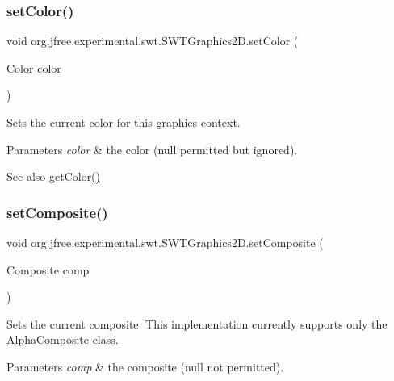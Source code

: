 \subsubsection{\texorpdfstring{set\+Color()}{setColor()}}
{\footnotesize\ttfamily void org.\+jfree.\+experimental.\+swt.\+S\+W\+T\+Graphics2\+D.\+set\+Color (\begin{DoxyParamCaption}\item[{Color}]{color }\end{DoxyParamCaption})}

Sets the current color for this graphics context.


\begin{DoxyParams}{Parameters}
{\em color} & the color ({\ttfamily null} permitted but ignored).\\
\hline
\end{DoxyParams}
\begin{DoxySeeAlso}{See also}
\mbox{\hyperlink{classorg_1_1jfree_1_1experimental_1_1swt_1_1_s_w_t_graphics2_d_ad1120d4f056f30d9801f65a898f89ed7}{get\+Color()}} 
\end{DoxySeeAlso}
\mbox{\label{classorg_1_1jfree_1_1experimental_1_1swt_1_1_s_w_t_graphics2_d_a0be3cf64bf3d73c747d7007d9a895cce}} 
\subsubsection{\texorpdfstring{set\+Composite()}{setComposite()}}
{\footnotesize\ttfamily void org.\+jfree.\+experimental.\+swt.\+S\+W\+T\+Graphics2\+D.\+set\+Composite (\begin{DoxyParamCaption}\item[{Composite}]{comp }\end{DoxyParamCaption})}

Sets the current composite. This implementation currently supports only the \mbox{\hyperlink{}{Alpha\+Composite}} class.


\begin{DoxyParams}{Parameters}
{\em comp} & the composite ({\ttfamily null} not permitted). \\
\hline
\end{DoxyParams}
\mbox{\label{classorg_1_1jfree_1_1experimental_1_1swt_1_1_s_w_t_graphics2_d_a3e7c3e125e139c6c836348d6eeaaeed8}} 
